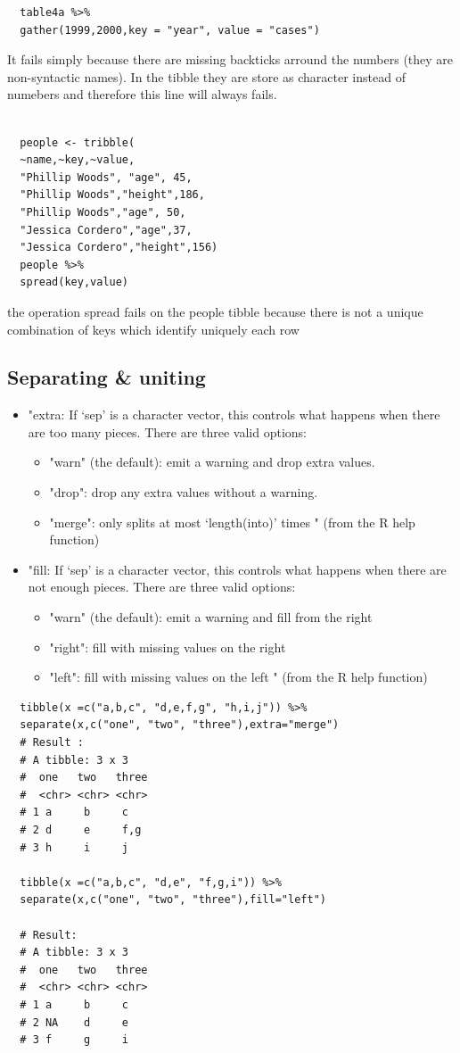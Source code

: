 \documentclass[11pt]{article}
\begin{document}
\begin{verbatim}
  table4a %>%
  gather(1999,2000,key = "year", value = "cases")
\end{verbatim}
It fails simply because there are missing backticks arround the numbers (they are non-syntactic names).
In the tibble they are store as character instead of numebers and therefore this line will always fails.
\begin{verbatim}

  people <- tribble(
  ~name,~key,~value,
  "Phillip Woods", "age", 45,
  "Phillip Woods","height",186,
  "Phillip Woods","age", 50,
  "Jessica Cordero","age",37,
  "Jessica Cordero","height",156)
  people %>%
  spread(key,value)
\end{verbatim}

the operation spread fails on the people tibble because there is not a unique combination
of keys which identify uniquely each row
\subsection{Separating \& uniting}
\label{sec:orgad75eff}
\begin{itemize}
\item "extra: If ‘sep’ is a character vector, this controls what
  happens when there are too many pieces. There are three valid
  options:
  \begin{itemize}
  \item "warn" (the default): emit a warning and drop extra  values.
  \item "drop": drop any extra values without a warning.
  \item "merge": only splits at most ‘length(into)’ times " (from the R
    help function)
  \end{itemize}

\item "fill: If ‘sep’ is a character vector, this controls what
  happens when there are not enough pieces. There are three valid
  options:
  \begin{itemize}
  \item "warn" (the default): emit a warning and fill from the right
  \item "right": fill with missing values on the right
  \item "left": fill with missing values on the left " (from the R
    help function)
  \end{itemize}
\end{itemize}


\begin{verbatim}
  tibble(x =c("a,b,c", "d,e,f,g", "h,i,j")) %>%
  separate(x,c("one", "two", "three"),extra="merge")
  # Result :
  # A tibble: 3 x 3
  #  one   two   three
  #  <chr> <chr> <chr>
  # 1 a     b     c
  # 2 d     e     f,g
  # 3 h     i     j

  tibble(x =c("a,b,c", "d,e", "f,g,i")) %>%
  separate(x,c("one", "two", "three"),fill="left")

  # Result:
  # A tibble: 3 x 3
  #  one   two   three
  #  <chr> <chr> <chr>
  # 1 a     b     c
  # 2 NA    d     e
  # 3 f     g     i
\end{verbatim}
\end{document}
